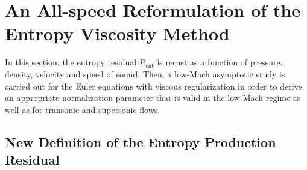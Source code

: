 \documentclass[preprint,10pt]{elsarticle}
\newcommand{\resi}{R_\text{ent}}
\begin{document}
\section{An All-speed Reformulation of the Entropy Viscosity Method} \label{sec:extension}

In this section, the entropy residual $\resi$ is recast as a function of pressure, density, velocity and speed 
of sound. Then, a low-Mach asymptotic study is carried out for the Euler equations with viscous regularization 
in order to derive an appropriate normalization parameter that is valid in the low-Mach regime as well as for 
transonic and supersonic flows. 

\subsection{New Definition of the Entropy Production Residual}\label{sec:new_ent_prod} 
\end{document}
